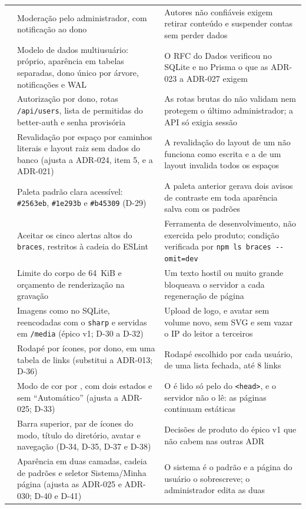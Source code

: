 \begin{longtable}{@{}L{2.0cm}L{5.6cm}L{6.4cm}@{}}
 & Moderação pelo administrador, com notificação ao dono & Autores não confiáveis exigem retirar conteúdo e suspender contas sem perder dados\\
 & Modelo de dados multiusuário:  próprio, aparência em tabelas separadas, dono único por árvore, notificações e WAL & O RFC do Dados verificou no SQLite e no Prisma o que as ADR-023 a ADR-027 exigem\\
 & Autorização por dono, rotas \texttt{/api/users}, lista de permitidas do better-auth e senha provisória & As rotas brutas do  não validam nem protegem o último administrador; a API só exigia sessão\\
 & Revalidação por espaço por caminhos literais e layout raiz sem dados do banco (ajusta a ADR-024, item 5, e a ADR-021) & A revalidação do layout de um  não funciona como escrita e a de um layout invalida todos os espaços\\
 & Paleta padrão clara acessível: \texttt{\#2563eb}, \texttt{\#1e293b} e \texttt{\#b45309} (D-29) & A paleta anterior gerava dois avisos de contraste em toda aparência salva com os padrões\\
 & Aceitar os cinco alertas altos do \texttt{braces}, restritos à cadeia do ESLint & Ferramenta de desenvolvimento, não exercida pelo produto; condição verificada por \texttt{npm ls braces -{}-omit=dev}\\
 & Limite do corpo de 64~KiB e orçamento de renderização na gravação & Um texto hostil ou muito grande bloqueava o servidor a cada regeneração de página\\
 & Imagens como  no SQLite, reencodadas com o \texttt{sharp} e servidas em \texttt{/media} (épico v1; D-30 a D-32) & Upload de logo,  e avatar sem volume novo, sem SVG e sem vazar o IP do leitor a terceiros\\
 & Rodapé por ícones, por dono, em uma tabela de links (substitui a ADR-013; D-36) & Rodapé escolhido por cada usuário, de uma lista fechada, até 8 links\\
 & Modo de cor por , com dois estados e sem ``Automático'' (ajusta a ADR-025; D-33) & O  é lido só pelo  do \texttt{<head>}, e o servidor não o lê: as páginas continuam estáticas\\
 & Barra superior, par de ícones do modo, título do diretório, avatar e navegação (D-34, D-35, D-37 e D-38) & Decisões de produto do épico v1 que não cabem nas outras ADR\\
 & Aparência em duas camadas, cadeia de padrões e seletor Sistema/Minha página (ajusta as ADR-025 e ADR-030; D-40 e D-41) & O sistema é o padrão e a página do usuário o sobrescreve; o administrador edita as duas\\
\end{longtable}
\endgroup

